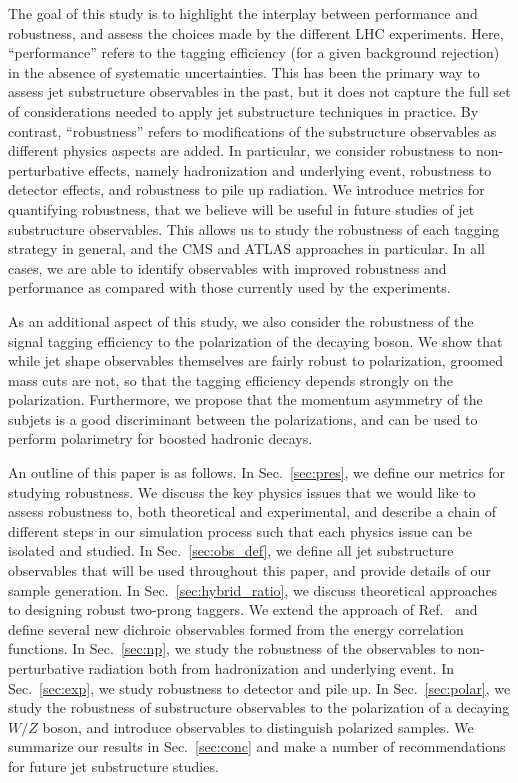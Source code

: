 \documentclass[11pt,letterpaper]{article}
\DeclareRobustCommand{\Sec}[1]{Sec.~\ref{#1}}
\DeclareRobustCommand{\Ref}[1]{Ref.~\cite{#1}}
\begin{document}
The goal of this study is to highlight the interplay between performance and robustness, and assess the choices made by the different LHC experiments.
%
Here, ``performance'' refers to the tagging efficiency (for a given background rejection) in the absence of systematic uncertainties.
%
This has been the primary way to assess jet substructure observables in the past, but it does not capture the full set of considerations needed to apply jet substructure techniques in practice.
%
By contrast, ``robustness'' refers to modifications of the substructure observables as different physics aspects are added.
%
In particular, we consider robustness to non-perturbative effects, namely hadronization and underlying event, robustness to detector effects, and robustness to pile up radiation.
%
We introduce metrics for quantifying robustness, that we believe will be useful in future studies of jet substructure observables.
%
This allows us to study the robustness of each tagging strategy in general, and the CMS and ATLAS approaches in particular.
%
In all cases, we are able to identify observables with improved robustness and performance as compared with those currently used by the experiments.
%
%


As an additional aspect of this study, we also consider the robustness of the signal tagging efficiency to the polarization of the decaying boson. We show that while jet shape observables themselves are fairly robust to polarization, groomed mass cuts are not, so that the tagging efficiency depends strongly on the polarization. Furthermore, we propose that the momentum  asymmetry of the subjets is a good discriminant between the polarizations, and can be used to perform polarimetry for boosted hadronic decays. 







An outline of this paper is as follows.
%
In \Sec{sec:pres}, we define our metrics for studying robustness.
%
We discuss the key physics issues that we would like to assess robustness to, both theoretical and experimental, and describe a chain of different steps in our simulation process such that each physics issue can be isolated and studied.
%
In \Sec{sec:obs_def}, we define all jet substructure observables that will be used throughout this paper, and  provide details of our sample generation.
%
In \Sec{sec:hybrid_ratio}, we discuss theoretical approaches to designing robust two-prong taggers.
%
We extend the approach of \Ref{Salam:2016yht} and define several new dichroic observables formed from the energy correlation functions.  
%
In \Sec{sec:np}, we study the robustness of the observables to non-perturbative radiation both from hadronization and underlying event.
%
In \Sec{sec:exp}, we study robustness to detector and pile up.
%
In \Sec{sec:polar}, we study the robustness of substructure observables to the polarization of a decaying $W/Z$ boson, and introduce observables to distinguish polarized samples.
%
We summarize our results in \Sec{sec:conc} and make a number of recommendations for future jet substructure studies.
\end{document}
